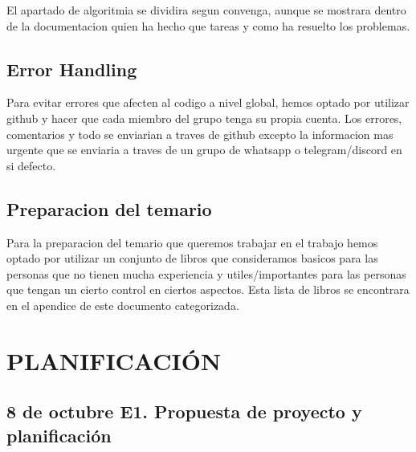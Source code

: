 \documentclass{article}
\theoremstyle{definition}
\begin{document}
El apartado de algoritmia se dividira segun convenga, aunque se mostrara dentro de la documentacion quien ha hecho que tareas y como ha resuelto los problemas.
\subsection{Error Handling}

Para evitar errores que afecten al codigo a nivel global, hemos optado por utilizar github y hacer que cada miembro del grupo tenga su propia cuenta. Los errores, comentarios y todo se enviarian a traves de github excepto la informacion mas urgente que se enviaria a traves de un grupo de whatsapp o telegram/discord en si defecto.

\subsection{Preparacion del temario}

Para la preparacion del temario que queremos trabajar en el trabajo hemos optado por utilizar un conjunto de libros que consideramos basicos para las personas que no tienen mucha experiencia y utiles/importantes para las personas que tengan un cierto control en ciertos aspectos. Esta lista de libros se encontrara en el apendice de este documento categorizada.


\section{PLANIFICACIÓN}


\subsection{8 de octubre	E1. Propuesta de proyecto y planificación }
\end{document}
